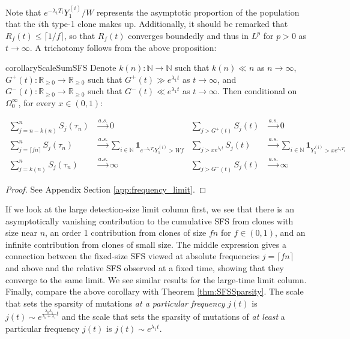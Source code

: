 \documentclass{article}
\numberwithin{equation}{section}
\begin{document}
Note that $e^{-\lambda_1 T_i}Y_1^{(i)}/W$ represents the asymptotic proportion of the population that the $i$th type-1 clone makes up. Additionally, it should be remarked that $R_f(t)\leq \lceil 1/f\rceil$, so that $R_f(t)$ converges boundedly and thus in $L^p$ for $p>0$ as $t\to\infty$. A trichotomy follows from the above proposition:
\begin{restatable}{corollary}{ScaleSumSFS}
    Denote $k(n):\mathbb{N}\to \mathbb{N}$ such that $k(n)\ll n$ as $n\to\infty$, $G^+(t):\mathbb{R}_{\geq 0}\to \mathbb{R}_{\geq 0}$ such that $G^+(t)\gg e^{\lambda_1 t}$ as $t\to\infty$, and $G^-(t):\mathbb{R}_{\geq 0}\to \mathbb{R}_{\geq 0}$ such that $G^-(t)\ll e^{\lambda_1 t}$ as $t\to\infty$. Then conditional on $\Omega_0^\infty$, for every $x\in (0,1)$:


  \begin{align*}
    \sum_{j=n-k(n)}^{n} S_j(\tau_n)&\overset{a.s.}{\to} 0 &\sum_{j> G^+(t)}S_j(t)&\overset{a.s.}{\to}0\\
    \sum_{j=\lceil fn\rceil }^{n} S_j(\tau_n)&\overset{a.s.}{\to} \sum_{i\in \mathbb{N}}\mathbf{1}_{e^{-\lambda_1 T_i}Y_1^{(i)}>Wf}& \sum_{j> xe^{\lambda_1 t}}S_j(t)&\overset{a.s.}{\to}\sum_{i\in \mathbb{N}}\mathbf{1}_{Y_1^{(i)}> xe^{\lambda_1 T_i}}\\
    \sum_{j=k(n)}^{n} S_j(\tau_n)&\overset{a.s.}{\to} \infty & \sum_{j> G^-(t)}S_j(t)&\overset{a.s.}{\to}\infty
  \end{align*}\label{cor:scale_sum_SFS}
\end{restatable}
\begin{proof}
  See Appendix Section \ref{app:frequency_limit}.
\end{proof}
If we look at the large detection-size limit column first, we see that there is an asymptotically vanishing contribution to the cumulative SFS from clones with size near $n$, an order 1 contribution from clones of size $fn$ for $f\in (0,1)$, and an infinite contribution from clones of small size. The middle expression gives a connection between the fixed-size SFS viewed at absolute frequencies $j = \lceil fn \rceil$ and above and the relative SFS observed at a fixed time, showing that they converge to the same limit.
We see similar results for the large-time limit column. 
Finally, compare the above corollary with Theorem \ref{thm:SFSSparsity}. The scale that sets the sparsity of mutations \textit{at a particular frequency} $j(t)$ is $j(t)\sim e^{\frac{\lambda_0\lambda_1}{\lambda_0+\lambda_1}t}$ and the scale that sets the sparsity of mutations of \textit{at least} a particular frequency $j(t)$ is $j(t)\sim e^{\lambda_1 t}$.
\end{document}

